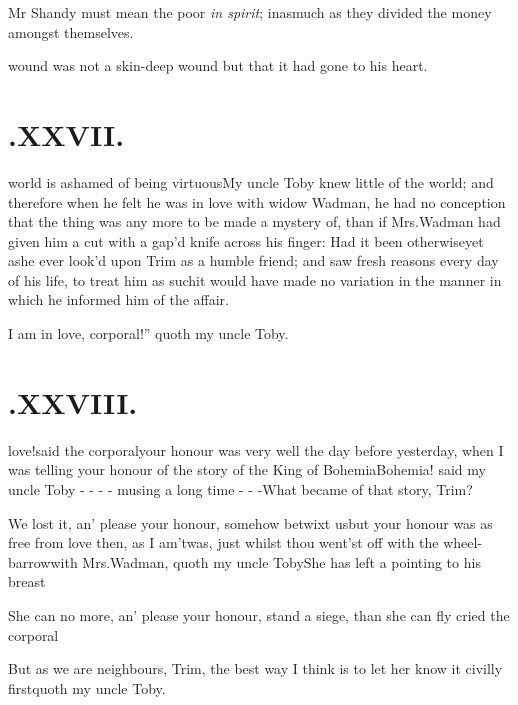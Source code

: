 \documentclass{article}
\begin{document}
\bgroup\small
\indent\fnast\enspace Mr Shandy must mean the poor \textit{in spirit};
inasmuch as they divided the money amongst themselves.
\par\egroup
{}\eject

\noindent wound was not a skin-deep wound\tsh\break
but that it had gone to his heart.


\section{.\enspace XXVII.}

 world is ashamed of being
vir\-tuous\tsh My uncle Toby knew little of the
world; and therefore when he felt he was in love with widow
Wadman, he had no conception that the thing was any more to
be made a mystery of, than if Mrs.\@ Wadman had given him a
cut with a gap’d knife across his finger: Had it been
otherwise\tsh yet as\break he ever look’d upon Trim
as a humble friend; and saw fresh reasons every day of his life, to
treat him as such\tsh it would have made no variation in
the manner in which he informed him of the\break
affair.\etp{}

\lqq I am in love, corporal!” quoth my uncle
Toby.

\section{.\enspace XXVIII.}

 love!\tsh said the
corporal\tsk your honour was very well the day before yesterday,
when I was telling your honour of the story of the King of
Bohemia\break\null\tsk Bohemia! said my uncle Toby - - - -\break
musing a long time - - -\enspace What became of that story,
Trim?

\tsh We lost it, an’ please your honour, somehow betwixt
us\tsk but your honour was as free from love then, as I
am\tsh\break ’twas, just whilst thou went’st off with
the wheel-barrow\tsh with Mrs.\@ Wadman, quoth my
uncle Toby\tsh She has left a
 pointing to his breast\tsh

\tsh She can no more, an’ please your\break
honour, stand a siege, than she can fly\tsk\break
cried the corporal\tsh

\tsh But as we are neighbours, Trim,\break
\tsk the
best way I think is to let her know it civilly first\tsk quoth my
uncle Toby.
\end{document}
